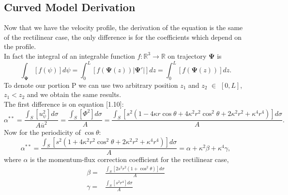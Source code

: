 \documentclass[a4paper]{report}
\begin{document}
\subsection{Curved Model Derivation}
Now that we have the velocity profile, the derivation of the equation is the same of the rectilinear case, the only difference is for the coefficients which depend on the profile.\\
In fact the integral of an integrable  function $f: \mathbb{R}^3 \rightarrow \mathbb{R}$ on trajectory $\boldsymbol{\Psi}$ is
\begin{equation}
\int_{\boldsymbol{\Psi}} [f(\psi) ] d\psi =\int_0^L [f(\boldsymbol{\Psi}(z)) |\boldsymbol{\Psi}'|]dz=\int_0^L [f(\boldsymbol{\Psi}(z))] dz.
\end{equation}
To denote our portion P we can use two arbitrary position $z_1$ and $z_2$ $\in$ $[0,L]$, $z_1<z_2$ and we obtain the same results.\\
The first difference is on equation [1.10]:
\begin{equation*}
\alpha^{**}= \frac{\int_S [u_{\psi}^2] d\sigma}{A \overline{u}^2}=\frac{\int_S [\Phi^2]d\sigma}{A}= \frac{\int_S [s^2(1-4 \kappa r \cos \theta +4 \kappa^2 r^2 \cos^2 \theta + 2 \kappa^2 r^2 + \kappa^4 r^4)]d\sigma}{A}.
\end{equation*}
Now for the periodicity of $\cos \theta$:
\begin{equation}
\alpha^{**}= \frac{\int_S [s^2(1+4 \kappa^2 r^2 \cos^2 \theta + 2 \kappa^2 r^2 + \kappa^4 r^4)]d\sigma}{A}=\alpha +\kappa^2 \beta + \kappa^4 \gamma,
\end{equation}
where $\alpha$ is the momentum-flux correction coefficient for the rectilinear case,
\begin{equation}
\begin{split}
\beta=&\frac{\int_S [2 s^2 r^2 (1+\cos^2 \theta)]d\sigma}{A}\\
\gamma=&\frac{\int_S[s^2 r^4]d\sigma}{A}
\end{split}
\end{equation}
\end{document}
